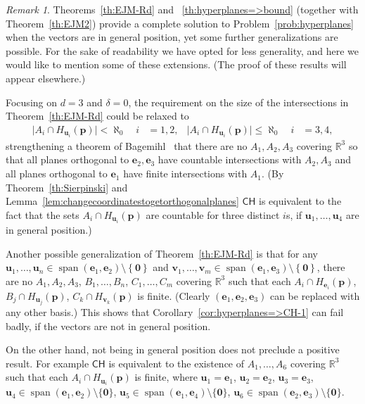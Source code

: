 \documentclass[12pt]{amsart}
\newcommand{\CH}{{\mathsf{CH}}}	%
\newcommand{\R}{\mathbb{R}}	%
\newcommand{\set}[1]{\mathopen \{ {#1} \mathclose \}} %
\newcommand{\setLR}[1]{\left \{ {#1} \right \}} %
\newcommand{\card}[1]{\mathopen | #1 \mathclose |}		%
\DeclareMathOperator{\Span}{span}
\theoremstyle{plain}
\theoremstyle{definition}
\theoremstyle{remark}
\newtheorem{remark}[theorem]{Remark}
\begin{document}
\begin{remark}\label{rmk:furtherresults}
Theorems~\ref{th:EJM-Rd} and ~\ref{th:hyperplanes=>bound} (together with Theorem~\ref{th:EJM2}) provide a complete solution to Problem~\ref{prob:hyperplanes} when the vectors are in general position, yet some further generalizations are possible.
For the sake of readability we have opted for less generality, and here we would like to mention some of these extensions.
(The proof of these results will appear elsewhere.)

Focusing on \( d = 3 \) and \( \delta = 0 \), the requirement on the size of the intersections in Theorem~\ref{th:EJM-Rd} could be relaxed to
\begin{align*}
\card{ A_i \cap H_{ \mathbf{u}_i } ( \mathbf{p} ) } < \aleph_0 \quad i & = 1 , 2 , 
&
\card{ A_i \cap H_{ \mathbf{u}_i } ( \mathbf{p} ) } \leq \aleph_0 \quad i & = 3 , 4 ,
\end{align*}
strengthening a theorem of Bagemihl~\cite{Bagemihl:1959te} that there are no \( A_1 , A_2 , A_3 \) covering \( \R^3 \) so that all planes orthogonal to \( \mathbf{e}_2 , \mathbf{e}_3 \) have countable intersections with \( A_2 , A_3 \) and all planes orthogonal to \( \mathbf{e}_1 \) have finite intersections with \( A_1 \).
(By Theorem~\ref{th:Sierpinski} and Lemma~\ref{lem:changecoordinatestogetorthogonalplanes} \( \CH \) is equivalent to the fact that the sets \( A_i \cap H_{ \mathbf{u}_i } ( \mathbf{p} ) \) are countable for three distinct \( i \)s, if \( \mathbf{u}_1, \dots , \mathbf{u}_4 \) are in general position.)

Another possible generalization of Theorem~\ref{th:EJM-Rd} is that for any \( \mathbf{u}_1 , \dots , \mathbf{u}_n \in \Span ( \mathbf{e}_1 , \mathbf{e}_2 ) \setminus \setLR{\mathbf{0}} \) and \( \mathbf{v}_1 , \dots , \mathbf{v}_m \in \Span ( \mathbf{e}_1 , \mathbf{e}_3 ) \setminus \setLR{\mathbf{0}} \), there are no \( A_1 , A_2 , A_3 \), \( B_1 , \dots , B_n \), \( C_1 , \dots , C_m \) covering \( \R^3 \) such that each \( A_i \cap H_{\mathbf{e}_i } ( \mathbf{p} ) \), \( B_j \cap H_{\mathbf{u}_j } ( \mathbf{p} ) \), \( C_k \cap H_{ \mathbf{v}_k } ( \mathbf{p} ) \) is finite.
(Clearly \( ( \mathbf{e}_1 , \mathbf{e}_2 , \mathbf{e}_3 ) \) can be replaced with any other basis.)
This shows that Corollary~\ref{cor:hyperplanes=>CH-1} can fail badly, if the vectors are not in general position.

On the other hand, not being in general position does not preclude a positive result.
For example \( \CH \) is equivalent to the existence of \( A_1 , \dots , A_6 \) covering \( \R^3 \) such that each \( A_i \cap H_{\mathbf{u}_i } ( \mathbf{p} ) \) is finite, where \( \mathbf{u}_1 = \mathbf{e}_1 \), \( \mathbf{u}_2 = \mathbf{e}_2 \), \( \mathbf{u}_3 = \mathbf{e}_3 \), \( \mathbf{u}_4 \in \Span ( \mathbf{e}_1 , \mathbf{e}_2 ) \setminus \set{ \mathbf{0}} \), \( \mathbf{u}_5 \in \Span ( \mathbf{e}_1 , \mathbf{e}_4 ) \setminus \set{ \mathbf{0}} \), \( \mathbf{u}_6 \in \Span ( \mathbf{e}_2 , \mathbf{e}_3 ) \setminus \set{ \mathbf{0}} \).
\end{remark}
\end{document}
